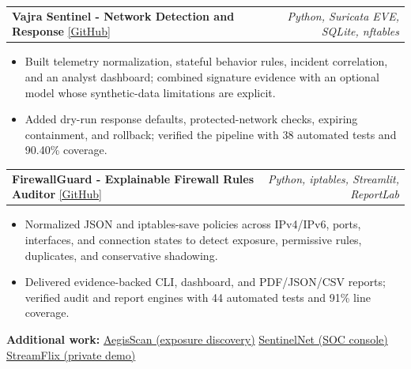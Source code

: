 \documentclass[10pt,letterpaper]{article}
\makeatletter
\newenvironment{resumeitems}{
  \begin{itemize}[
    leftmargin=13pt,
    label=\textbullet,
    itemsep=0.5pt,
    parsep=0pt,
    topsep=1.5pt,
    partopsep=0pt
  ]
}{
  \end{itemize}
}
\newcommand{\projectheading}[3]{%
  \begin{tabularx}{\linewidth}{@{}>{\raggedright\arraybackslash}X@{\hspace{8pt}}r@{}}
    \textbf{#1} \href{#2}{\textcolor{linkblue}{[GitHub]}} &
    \textit{\color{muted}#3}
  \end{tabularx}\par\vspace{1pt}
}
\makeatother
\begin{document}
\projectheading
  {Vajra Sentinel - Network Detection and Response}
  {https://github.com/darshnoor30/Vajra-Sentinel}
  {Python, Suricata EVE, SQLite, nftables}
\begin{resumeitems}
  \item Built telemetry normalization, stateful behavior rules, incident correlation, and an analyst dashboard; combined signature evidence with an optional model whose synthetic-data limitations are explicit.
  \item Added dry-run response defaults, protected-network checks, expiring containment, and rollback; verified the pipeline with 38 automated tests and 90.40\% coverage.
\end{resumeitems}

\projectheading
  {FirewallGuard - Explainable Firewall Rules Auditor}
  {https://github.com/darshnoor30/FirewallGuard}
  {Python, iptables, Streamlit, ReportLab}
\begin{resumeitems}
  \item Normalized JSON and iptables-save policies across IPv4/IPv6, ports, interfaces, and connection states to detect exposure, permissive rules, duplicates, and conservative shadowing.
  \item Delivered evidence-backed CLI, dashboard, and PDF/JSON/CSV reports; verified audit and report engines with 44 automated tests and 91\% line coverage.
\end{resumeitems}

\small
\textbf{Additional work:}
\href{https://github.com/darshnoor30/AegisScan}{AegisScan (exposure discovery)}
\textbar{} \href{https://github.com/darshnoor30/SentinelNet}{SentinelNet (SOC console)}
\textbar{} \href{https://github.com/darshnoor30/StreamFlix}{StreamFlix (private demo)}
\end{document}
